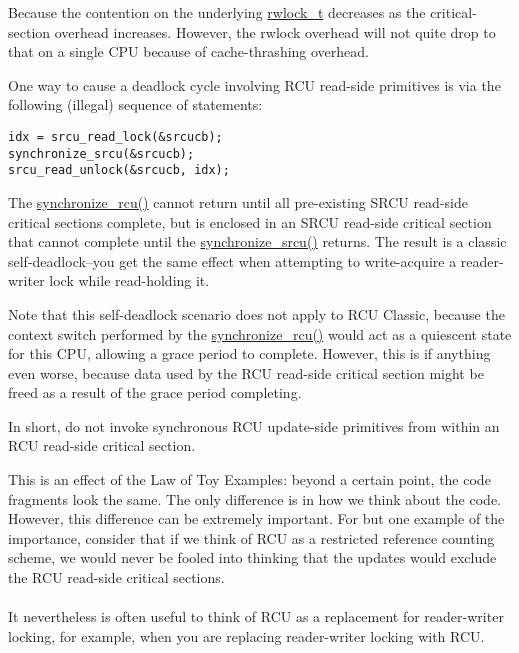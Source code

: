 Because the contention on the underlying
\url{rwlock_t} decreases as the critical-section overhead
increases.
However, the rwlock overhead will not quite drop to that on a single
CPU because of cache-thrashing overhead.


One way to cause a deadlock cycle involving
RCU read-side primitives is via the following (illegal) sequence
of statements:

\vspace{5pt}
\begin{minipage}[t]{\columnwidth}
\small
\begin{verbatim}
idx = srcu_read_lock(&srcucb);
synchronize_srcu(&srcucb);
srcu_read_unlock(&srcucb, idx);
\end{verbatim}
\end{minipage}
\vspace{5pt}

The \url{synchronize_rcu()} cannot return until all
pre-existing SRCU read-side critical sections complete, but
is enclosed in an SRCU read-side critical section that cannot
complete until the \url{synchronize_srcu()} returns.
The result is a classic self-deadlock--you get the same
effect when attempting to write-acquire a reader-writer lock
while read-holding it.

Note that this self-deadlock scenario does not apply to
RCU Classic, because the context switch performed by the
\url{synchronize_rcu()} would act as a quiescent state
for this CPU, allowing a grace period to complete.
However, this is if anything even worse, because data used
by the RCU read-side critical section might be freed as a
result of the grace period completing.

In short, do not invoke synchronous RCU update-side primitives
from within an RCU read-side critical section.


This is an effect of the Law of Toy Examples:
beyond a certain point, the code fragments look the same.
The only difference is in how we think about the code.
However, this difference can be extremely important.
For but one example of the importance, consider that if we think
of RCU as a restricted reference counting scheme, we would never
be fooled into thinking that the updates would exclude the RCU
read-side critical sections.
\\ ~ \\
It nevertheless is often useful to think of RCU as a replacement
for reader-writer locking, for example, when you are replacing reader-writer
locking with RCU.

